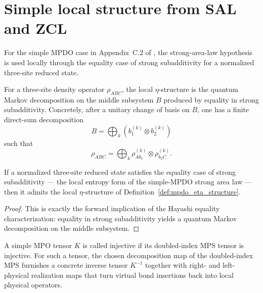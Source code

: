 \section{Simple local structure from SAL and ZCL}

For the simple MPDO case in Appendix~C.2 of \cite{Cirac2016MPDO_arXiv},
the strong-area-law hypothesis is used locally through the equality case of
strong subadditivity for a normalized three-site reduced state.

\begin{definition}
    \label{def:mpdo_eta_structure}
    \leanok
    For a three-site density operator $\rho_{ABC}$, the local $\eta$-structure
    is the quantum Markov decomposition on the middle subsystem $B$ produced by
    equality in strong subadditivity. Concretely, after a unitary change of
    basis on $B$, one has a finite direct-sum decomposition
    \[
        B = \bigoplus_k (b_1^{(k)} \otimes b_2^{(k)})
    \]
    such that
    \[
        \rho_{ABC} = \bigoplus_k \rho_{A b_1}^{(k)} \otimes \rho_{b_2 C}^{(k)}.
    \]
\end{definition}

\begin{theorem}
    \label{thm:sal_implies_eta_structure}
    \leanok
    If a normalized three-site reduced state satisfies the equality case of
    strong subadditivity --- the local entropy form of the simple-MPDO strong
    area law --- then it admits the local $\eta$-structure of
    Definition~\ref{def:mpdo_eta_structure}.
\end{theorem}

\begin{proof}
    \leanok
    This is exactly the forward implication of the Hayashi equality
    characterization: equality in strong subadditivity yields a quantum Markov
    decomposition on the middle subsystem.
\end{proof}

\begin{definition}
    \label{def:mpdo_injective_inverse_layer}
    \leanok
    A simple MPO tensor $K$ is called injective if its doubled-index MPS tensor
    is injective. For such a tensor, the chosen decomposition map of the
    doubled-index MPS furnishes a concrete inverse tensor $K^{-1}$ together
    with right- and left-physical realization maps that turn virtual bond
    insertions back into local physical operators.
\end{definition}

